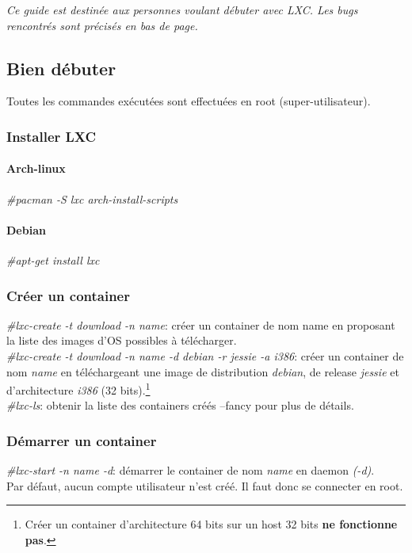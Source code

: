 \emph{Ce guide est destinée aux personnes voulant débuter avec LXC. Les bugs rencontrés sont précisés en bas de page. }

\subsection{Bien d\'ebuter}
Toutes les commandes ex\'ecut\'ees sont effectu\'ees en root (super-utilisateur).

\subsubsection{Installer LXC}
\paragraph{Arch-linux}
\emph{\#pacman -S lxc arch-install-scripts}
\paragraph{Debian}
\emph{\#apt-get install lxc}

\subsubsection{Cr\'eer un container}
\emph{\#lxc-create -t download -n name}: cr\'eer un container de nom name en proposant la liste des images d'OS possibles \`a t\'el\'echarger.\\ 

\emph{\#lxc-create -t download -n name -d debian -r jessie -a i386}: cr\'eer un container de nom \emph{name} en t\'el\'echargeant une image de distribution \emph{debian}, de release \emph{jessie} et d'architecture \emph{i386} (32 bits).\footnote{Cr\'eer un container d'architecture 64 bits sur un host 32 bits \textbf{ne fonctionne pas}.}\\

\emph{\#lxc-ls}: obtenir la liste des containers cr\'e\'es --fancy pour plus de d\'etails.\\
  
\subsubsection{D\'emarrer un container}
\emph{\#lxc-start -n name  -d}: d\'emarrer le container de nom \emph{name} en daemon \emph{(-d)}.\\
Par d\'efaut, aucun compte utilisateur n'est cr\'e\'e. Il faut donc se connecter en root.\\ 

